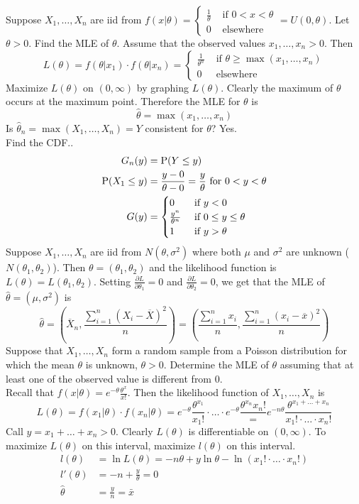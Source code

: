 \documentclass[12pt]{article}
\begin{document}
Suppose $X_1,\dots,X_n$ are iid from $f(x|\theta) = \begin{cases} \frac{1}{\theta} &\text{ if } 0 < x < \theta \\ 0 &\text{ elsewhere} \end{cases} = U(0,\theta)$. Let $\theta > 0$. Find the MLE of $\theta$. Assume that the observed values $x_1,\dots,x_n > 0$. Then
$$L(\theta) = f(\theta|x_1)\cdot f(\theta|x_n) = \begin{cases} \frac{1}{\theta^n} &\text{ if } \theta \geq \max(x_1,\dots,x_n) \\ 0 &\text{ elsewhere} \end{cases} $$ 
Maximize $L(\theta)$ on $(0,\infty)$ by graphing $L(\theta)$. Clearly the maximum of $\theta$ occurs at the maximum point. Therefore the MLE for $\theta$ is 
$$\hat{\theta} = \max(x_1,\dots,x_n)$$ 
Is $\hat{\theta}_n = \max(X_1,\dots,X_n) = Y$ consistent for $\theta$? Yes. \\
Find the CDF.. $$ \begin{aligned} G_n(y) &= \mathrm{P}( Y \leq y ) \\ \mathrm{P}( X_1 \leq y ) &= \frac{y-0}{\theta - 0} = \frac{y}{\theta} \text{ for } 0 < y < \theta \\ G(y) &= \begin{cases} 0 &\text{ if } y < 0 \\ \frac{y^n}{\theta^n} &\text{ if } 0 \leq y \leq \theta \\ 1 &\text{ if } y > \theta \end{cases} \end{aligned} $$ 
Suppose $X_1,\dots,X_n$ are iid from $N(\theta, \sigma^2)$ where both $\mu$ and $\sigma^2$ are unknown ($N(\theta_1,\theta_2)$). Then $\theta = (\theta_1,\theta_2)$ and the likelihood function is $L(\theta) = L(\theta_1,\theta_2)$. Setting $\frac{\partial L}{\partial \theta_1} = 0$ and $\frac{\partial L}{\partial \theta_2} = 0$, we get that the MLE of $\hat{\theta} = (\mu, \sigma^2)$ is $$\hat{\theta} = (\overline{X}_n, \frac{\sum_{i=1}^n (X_i - \overline{X})^2}{n}) = (\frac{\sum_{i=1}^n x_i}{n}, \frac{\sum_{i=1}^n (x_i - \overline{x})^2}{n}) $$ 
Suppose that $X_1,\dots,X_n$ form a random sample from a Poisson distribution for which the mean $\theta$ is unknown, $\theta > 0$. Determine the MLE of $\theta$ assuming that at least one of the observed value is different from $0$. \\
Recall that $f(x|\theta) = e^{-\theta} \frac{\theta^x}{x!}$. Then the likelihood function of $X_1,\dots,X_n$ is $$L(\theta) = f(x_1|\theta)\cdot f(x_n|\theta) = e^{-\theta}\frac{\theta^{x_1}}{x_1!} \cdot \dots \cdot e^{-\theta}\frac{\theta^{x_n}{x_n!}} = e^{-n\theta} \frac{\theta^{x_1 + \dots + x_n}}{x_1!\cdot \dots \cdot x_n!}$$ Call $y = x_1 + \dots + x_n > 0$. Clearly $L(\theta)$ is differentiable on $(0,\infty)$. To maximize $L(\theta)$ on this interval, maximize $l(\theta)$ on this interval. $$ \begin{aligned} 
l(\theta) &= \ln L(\theta) = -n\theta + y\ln \theta - \ln(x_1!\cdot \dots \cdot x_n!) \\ l'(\theta) &= -n + \frac{y}{\theta} = 0 \\ \hat{\theta} &= \frac{y}{n} = \bar{x} \end{aligned} $$ 
\end{document}
